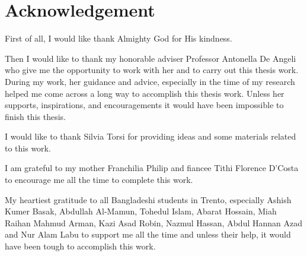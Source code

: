 \setcounter{page}{2}
{}
\chapter*{Acknowledgement}
First of all, I would like thank Almighty God for His kindness.

Then I would like to thank my honorable adviser Professor Antonella De Angeli
who give me the opportunity to work with her and to carry out this thesis work.
During my work, her guidance and advice, especially in the time of my research
helped me come across a long way to accomplish this thesis work. Unless her
supports, inspirations, and encouragements it would have been impossible to finish
this thesis.

I would like to thank Silvia Torsi for providing ideas and some materials
related to this  work.

I am grateful to my mother Franchilia Philip and fiancee Tithi Florence D'Costa to
encourage me all the time to complete this work.

My heartiest gratitude to all Bangladeshi students in Trento, especially Ashish
Kumer Basak, Abdullah Al-Mamun, Tohedul Islam, Abarat Hossain, Miah Raihan
Mahmud Arman, Kazi Asad Robin, Nazmul Hassan, Abdul Hannan Azad and Nur Alam
Labu to support me all the time and unless their help, it would have been tough
to accomplish this work.

\newpage